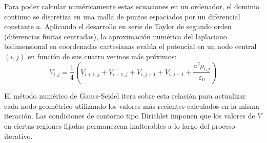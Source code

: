 Para poder calcular numéricamente estas ecuaciones en un ordenador, el dominio continuo se discretiza en una malla de puntos espaciados por un diferencial constante $a$. Aplicando el desarrollo en serie de Taylor de segundo orden (diferencias finitas centradas), la aproximación numérica del laplaciano bidimensional en coordenadas cartesianas evalúa el potencial en un nodo central $(i,j)$ en función de sus cuatro vecinos más próximos:
\begin{equation}
    V_{i,j} = \frac{1}{4} \left( V_{i+1,j} + V_{i-1,j} + V_{i,j+1} + V_{i,j-1} + \frac{a^2 \rho_{i,j}}{\varepsilon_0} \right)
    \label{eq:discretizacion_cartesiana}
\end{equation}

El método numérico de Gauss-Seidel itera sobre esta relación para actualizar cada nodo geométrico utilizando los valores más recientes calculados en la misma iteración. Las condiciones de contorno tipo Dirichlet imponen que los valores de $V$ en ciertas regiones fijadas permanezcan inalterables a lo largo del proceso iterativo.